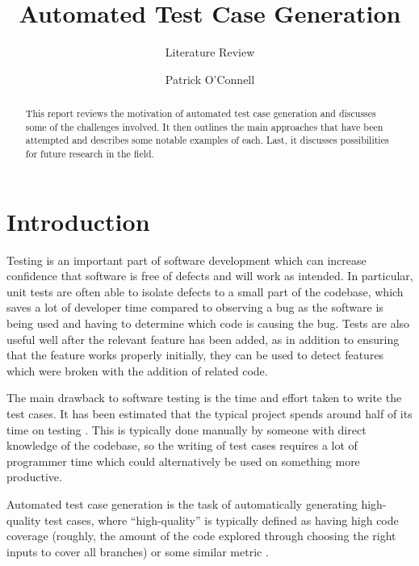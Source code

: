 \documentclass{sig-alternate-05-2015}
\begin{document}
\title{Automated Test Case Generation}
\subtitle{Literature Review}


\author{
\alignauthor
Patrick O'Connell \\
}

\maketitle

\begin{abstract}
This report reviews the motivation of automated test case generation and
discusses some of the challenges involved. It then outlines the main approaches
that have been attempted and describes some notable examples of each. Last, it
discusses possibilities for future research in the field.
\end{abstract}


\section{Introduction}

Testing is an important part of software development which can increase
confidence that software is free of defects and will work as intended. In
particular, unit tests are often able to isolate defects to a small part of the
codebase, which saves a lot of developer time compared to observing a bug as
the software is being used and having to determine which code is causing the
bug. Tests are also useful well after the relevant feature has been added, as
in addition to ensuring that the feature works properly initially, they can be
used to detect features which were broken with the addition of related code.

The main drawback to software testing is the time and effort taken to write the
test cases. It has been estimated that the typical project spends around half
of its time on testing \cite{beizer}. This is typically done manually by
someone with direct knowledge of the codebase, so the writing of test cases
requires a lot of programmer time which could alternatively be used on
something more productive.

Automated test case generation is the task of automatically generating
high-quality test cases, where ``high-quality'' is typically defined as having
high code coverage (roughly, the amount of the code explored through choosing
the right inputs to cover all branches) or some similar metric \cite{harman}.
\end{document}
